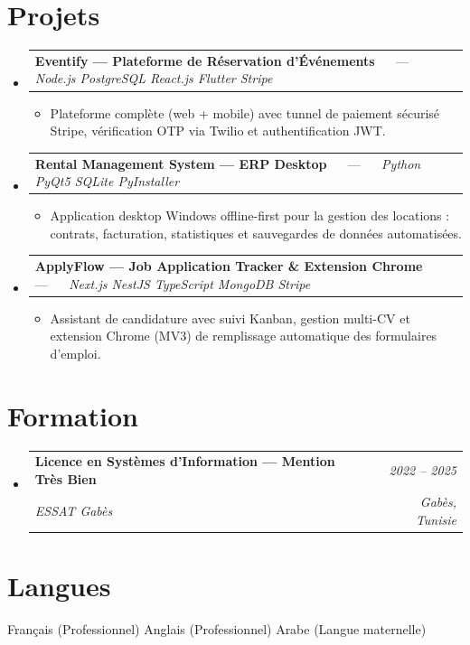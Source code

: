 \documentclass[letterpaper,9pt]{article}
\makeatletter
\newcommand{\resumeItem}[1]{\item\small{#1}}
\newcommand{\resumeSubheading}[4]{
  \vspace{-1pt}\item
  \begin{tabular*}{0.97\textwidth}[t]{l@{\extracolsep{\fill}}r}
    \textbf{#1} & \textit{\color{greytext}#2} \\
    \textit{\small\color{greytext} #3} & \textit{\small\color{greytext} #4}
  \end{tabular*}\vspace{-2pt}
}
\newcommand{\resumeProjectHeading}[2]{
  \item
  \begin{tabular*}{0.97\textwidth}{l@{\extracolsep{\fill}}r}
    \small #1 & #2
  \end{tabular*}\vspace{-1pt}
}
\newcommand{\resumeSubHeadingListStart}{\begin{itemize}[leftmargin=0.18in, label={}, itemsep=1.2pt, topsep=2.5pt, parsep=0pt]}
\newcommand{\resumeSubHeadingListEnd}{\end{itemize}\vspace{-2pt}}
\newcommand{\resumeProjectListStart}{\begin{itemize}[leftmargin=0.24in, label={}, itemsep=0.9pt, topsep=1.2pt, parsep=0pt]}
\newcommand{\resumeProjectListEnd}{\end{itemize}\vspace{-2pt}}
\makeatother
\begin{document}
\section{Projets}
\resumeSubHeadingListStart

  \resumeProjectHeading{\textbf{Eventify --- Plateforme de Réservation d'Événements} $\quad$ --- $\quad$ \emph{\color{greytext}Node.js \textperiodcentered{} PostgreSQL \textperiodcentered{} React.js \textperiodcentered{} Flutter \textperiodcentered{} Stripe}}{}
    \resumeProjectListStart
      \resumeItem{Plateforme complète (web + mobile) avec tunnel de paiement sécurisé Stripe, vérification OTP via Twilio et authentification JWT.}
    \resumeProjectListEnd

  \resumeProjectHeading{\textbf{Rental Management System --- ERP Desktop} $\quad$ --- $\quad$ \emph{\color{greytext}Python \textperiodcentered{} PyQt5 \textperiodcentered{} SQLite \textperiodcentered{} PyInstaller}}{}
    \resumeProjectListStart
      \resumeItem{Application desktop Windows offline-first pour la gestion des locations : contrats, facturation, statistiques et sauvegardes de données automatisées.}
    \resumeProjectListEnd

  \resumeProjectHeading{\textbf{ApplyFlow --- Job Application Tracker \& Extension Chrome} $\quad$ --- $\quad$ \emph{\color{greytext}Next.js \textperiodcentered{} NestJS \textperiodcentered{} TypeScript \textperiodcentered{} MongoDB \textperiodcentered{} Stripe}}{}
    \resumeProjectListStart
      \resumeItem{Assistant de candidature avec suivi Kanban, gestion multi-CV et extension Chrome (MV3) de remplissage automatique des formulaires d'emploi.}
    \resumeProjectListEnd

\resumeSubHeadingListEnd\vspace{-3pt}

\section{Formation}
\resumeSubHeadingListStart
  \resumeSubheading{Licence en Systèmes d'Information --- Mention Très Bien}{2022 -- 2025}{ESSAT Gabès}{Gabès, Tunisie}
\resumeSubHeadingListEnd\vspace{-1pt}

\section{Langues}
\begin{itemize}[leftmargin=0.18in, label={}, topsep=2pt, itemsep=1pt, parsep=0pt]
\footnotesize{
  \item Français (Professionnel) \textperiodcentered{} Anglais (Professionnel) \textperiodcentered{} Arabe (Langue maternelle)
}
\end{itemize}
\end{document}
